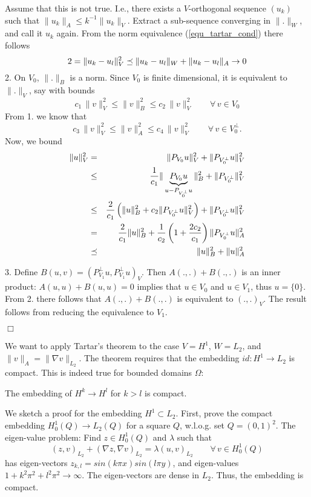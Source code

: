 Assume that this is not true. I.e., there exists a $V$-orthogonal sequence 
$(u_k)$ such that $\| u_k \|_A \leq k^{-1} \| u_k \|_V$. Extract a sub-sequence
converging in $\| . \|_W$, and call it $u_k$ again. From the norm
equivalence (\ref{equ_tartar_cond}) there follows
$$
2 = \| u_k - u_l \|_V^2 \preceq \| u_k - u_l \|_W + \| u_k - u_l \|_A \rightarrow 0
$$
2. On $V_0$, $\| . \|_B$ is a norm. Since $V_0$ is finite dimensional, it
is equivalent to $\|.\|_V$, say with bounds
$$
c_1 \, \| v \|_{V}^2 \leq \| v \|_B^2 \leq c_2 \, \| v \|_V^2 \qquad \forall \, v \in V_0
$$
From 1. we know that
$$
c_3 \, \| v \|_V^2 \leq \| v \|_A^2 \leq c_4 \, \| v \|_V^2 \qquad \forall \, v \in V_0^\bot.
$$
Now, we bound
\begin{eqnarray*}
\| u \|_V^2 & = & \| P_{V_0} u \|_V^2 + \| P_{V_0^\bot} u \|_V^2 \\
        & \leq & \frac{1}{c_1} \| \underbrace{P_{V_0} u }_{u - P_{V_0^\bot} u } \|_B^2 + \| P_{V_0^\bot} \|_V^2 \\
        & \leq & \frac{2}{c_1} \left( \| u \|_B^2 + c_2 \| P_{V_0^\bot} u \|_V^2 \right) + \| P_{V_0^\bot} u \|_V^2 \\
        & = & \frac{2}{c_1} \| u \|_B^2 + \frac{1}{c_2} \left(1 + \frac{2 c_2}{c_1} \right) \| P_{V_0^\bot} u \|_A^2 \\
        & \preceq & \| u \|_B^2 + \| u \|_A^2
\end{eqnarray*}

3. Define $B(u,v) = (P_{V_1}^\bot u, P_{V_1}^\bot u)_V$. Then $A(.,.)+B(.,.)$
is an inner product: $A(u,u)+B(u,u) = 0$ implies that $u \in V_0$ and $u \in V_1$, thus $u = \{ 0 \}$. From 2. there follows that $A(.,.)+B(.,.)$ is
equivalent to $(.,.)_V$. The result follows from reducing the equivalence 
to $V_1$.

\hfill $\Box$

We want to apply Tartar's theorem to the case $V = H^1$, $W = L_2$,
and $\|v \|_A = \| \nabla v \|_{L_2}$.
The theorem requires that the embedding $id : H^1 \rightarrow L_2$ is
compact. This is indeed true for bounded domains $\Omega$:

\begin{theorem} The embedding of $H^k \rightarrow H^l$ for $k > l$ is 
compact.
\end{theorem}
We sketch a proof for the embedding $H^1 \subset L_2$.
First, prove the compact embedding $H_0^1(Q) \rightarrow L_2(Q)$ for
a square $Q$, w.l.o.g. set $Q = (0,1)^2$. 
The eigen-value problem: Find $z \in H_0^1(Q)$ and $\lambda$ such that
$$
(z,v)_{L_2} + (\nabla z, \nabla v)_{L_2} = \lambda (u,v)_{L_2} \qquad 
\forall \, v \in H_0^1(Q)
$$
has eigen-vectors $z_{k,l} = sin (k \pi x) sin (l \pi y)$, and eigen-values
$1+k^2 \pi^2 + l^2 \pi^2 \rightarrow \infty$. The eigen-vectors are dense 
in $L_2$. Thus, the embedding is compact.

